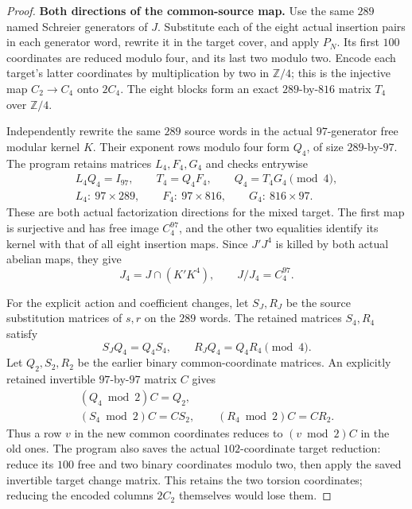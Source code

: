 \begin{proof}
\par\medskip\noindent\textbf{Both directions of the common-source map.}\quad
Use the same $289$ named Schreier generators of $J$.  Substitute
each of the eight actual insertion pairs in each generator word,
rewrite it in the target cover, and apply $P_N$.
Its first $100$ coordinates are reduced modulo four, and its
last two modulo two.  Encode each target's latter coordinates
by multiplication by two in $\mathbb Z/4$; this is the injective
map $C_2\to C_4$ onto $2C_4$.  The eight blocks form an exact
$289$-by-$816$ matrix $T_4$ over $\mathbb Z/4$.

Independently rewrite the same $289$ source words in the actual
$97$-generator free modular kernel $K$.  Their exponent rows
modulo four form $Q_4$, of size $289$-by-$97$.
The program retains matrices $L_4,F_4,G_4$ and checks entrywise
\[
 \begin{gathered}
 L_4Q_4=I_{97},\qquad T_4=Q_4F_4,\qquad Q_4=T_4G_4\pmod4,\\
 L_4:\ 97\times289,\qquad
 F_4:\ 97\times816,\qquad G_4:\ 816\times97.
 \end{gathered}                                                   \tag{CF4.8}
\]
These are both actual factorization directions for the mixed
target.  The first map is surjective and has free image
$C_4^{97}$, and the other two equalities identify its kernel with
that of all eight insertion maps.  Since $J'J^4$ is killed by
both actual abelian maps, they give
\[
                   J_4=J\cap(K'K^4),\qquad J/J_4=C_4^{97}.
                                                               \tag{CF4.9}
\]

For the explicit action and coefficient changes, let $S_J,R_J$
be the source substitution matrices of $s,r$ on the $289$ words.
The retained matrices $S_4,R_4$ satisfy
\[
 S_JQ_4=Q_4S_4,\qquad R_JQ_4=Q_4R_4\pmod4.
                                                               \tag{CF4.10}
\]
Let $Q_2,S_2,R_2$ be the earlier binary common-coordinate matrices.
An explicitly retained invertible $97$-by-$97$ matrix $C$ gives
\[
 \begin{gathered}
 (Q_4\bmod2)C=Q_2,\\
 (S_4\bmod2)C=CS_2,\qquad
 (R_4\bmod2)C=CR_2.
 \end{gathered}                                                   \tag{CF4.11}
\]
Thus a row $v$ in the new common coordinates reduces to
$(v\bmod2)C$ in the old ones.  The program also saves the actual
$102$-coordinate target reduction: reduce its $100$ free and two
binary coordinates modulo two, then apply the saved invertible
target change matrix.  This retains the two torsion coordinates;
reducing the encoded columns $2C_2$ themselves would lose them.


\end{proof}
